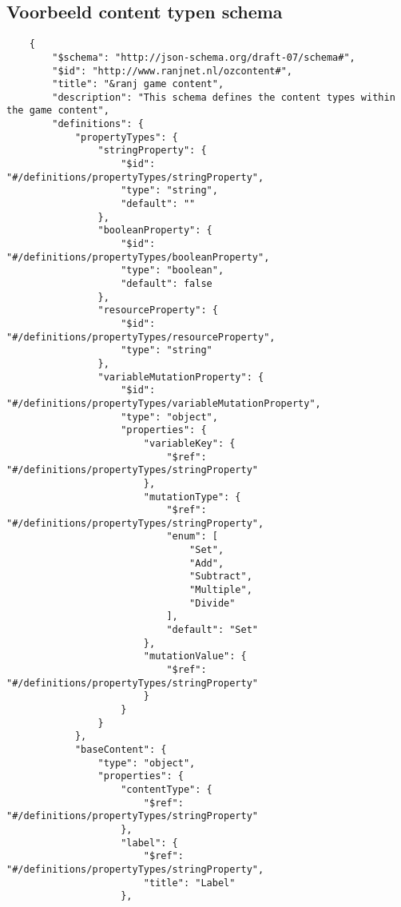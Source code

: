 \begin{appendices}
    \chapter{Voorbeeld content typen schema}
    \lstset{language=JSON}
    \begin{lstlisting}
    {
        "$schema": "http://json-schema.org/draft-07/schema#",
        "$id": "http://www.ranjnet.nl/ozcontent#",
        "title": "&ranj game content",
        "description": "This schema defines the content types within the game content",
        "definitions": {
            "propertyTypes": {
                "stringProperty": {
                    "$id": "#/definitions/propertyTypes/stringProperty",
                    "type": "string",
                    "default": ""
                },
                "booleanProperty": {
                    "$id": "#/definitions/propertyTypes/booleanProperty",
                    "type": "boolean",
                    "default": false
                },
                "resourceProperty": {
                    "$id": "#/definitions/propertyTypes/resourceProperty",
                    "type": "string"
                },
                "variableMutationProperty": {
                    "$id": "#/definitions/propertyTypes/variableMutationProperty",
                    "type": "object",
                    "properties": {
                        "variableKey": {
                            "$ref": "#/definitions/propertyTypes/stringProperty"
                        },
                        "mutationType": {
                            "$ref": "#/definitions/propertyTypes/stringProperty",
                            "enum": [
                                "Set",
                                "Add",
                                "Subtract",
                                "Multiple",
                                "Divide"
                            ],
                            "default": "Set"
                        },
                        "mutationValue": {
                            "$ref": "#/definitions/propertyTypes/stringProperty"
                        }
                    }
                }
            },
            "baseContent": {
                "type": "object",
                "properties": {
                    "contentType": {
                        "$ref": "#/definitions/propertyTypes/stringProperty"
                    },
                    "label": {
                        "$ref": "#/definitions/propertyTypes/stringProperty",
                        "title": "Label"
                    },

\end{lstlisting}
\end{appendices}
